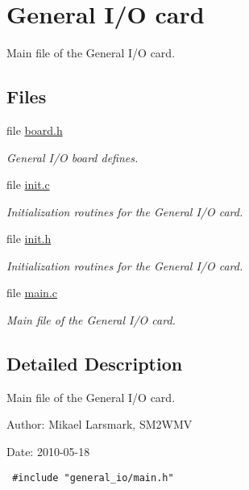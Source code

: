 \hypertarget{group__general__io__group}{
\section{General I/O card}
\label{group__general__io__group}
}
Main file of the General I/O card.  


\subsection*{Files}
\begin{CompactItemize}
\item 
file \hyperlink{general__io_2board_8h}{board.h}
\begin{CompactList}\small\item\em General I/O board defines. \item\end{CompactList}

\item 
file \hyperlink{general__io_2init_8c}{init.c}
\begin{CompactList}\small\item\em Initialization routines for the General I/O card. \item\end{CompactList}

\item 
file \hyperlink{general__io_2init_8h}{init.h}
\begin{CompactList}\small\item\em Initialization routines for the General I/O card. \item\end{CompactList}

\item 
file \hyperlink{general__io_2main_8c}{main.c}
\begin{CompactList}\small\item\em Main file of the General I/O card. \item\end{CompactList}

\end{CompactItemize}


\subsection{Detailed Description}
Main file of the General I/O card. 

\begin{Desc}
\item[Author:]Mikael Larsmark, SM2WMV \end{Desc}
\begin{Desc}
\item[Date:]2010-05-18 

\begin{Code}\begin{verbatim} #include "general_io/main.h" 
\end{verbatim}
\end{Code}

 \end{Desc}
